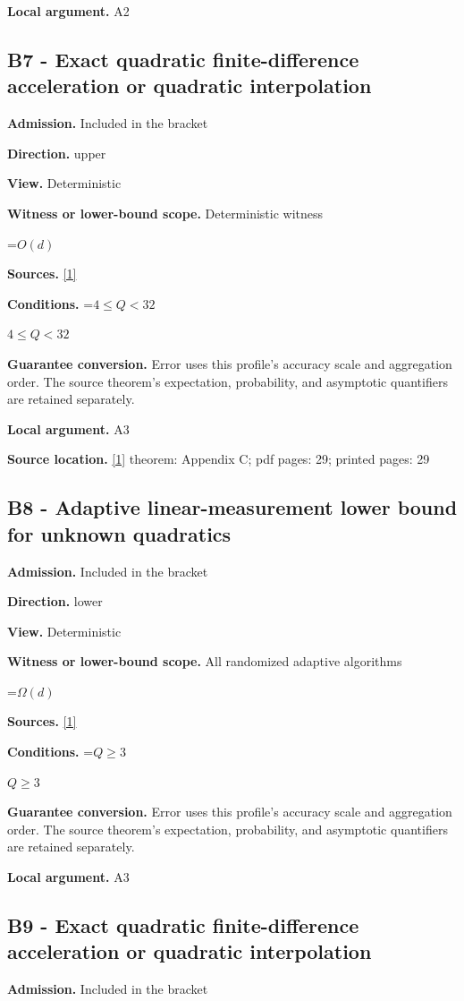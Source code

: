 \documentclass[10pt,a4paper]{article}
\newcommand{\AtlasMath}[1]{\par\begingroup\centering\setbox0=\hbox{$\displaystyle #1$}\ifdim\wd0>1.4\linewidth\typeout{ATLAS WIDE FORMULA: \the\wd0}\fi\ifdim\wd0>\linewidth\resizebox{\linewidth}{!}{\box0}\else\box0\fi\par\endgroup}
\newcommand{\AtlasInlineMath}[1]{\begingroup\setbox0=\hbox{$#1$}\ifdim\wd0>.4\linewidth\endgroup\AtlasMath{#1}\else\endgroup$#1$\fi}
\begin{document}
\textbf{Local argument.} A2

\subsection{B7 - Exact quadratic finite-difference acceleration or quadratic interpolation}
\textbf{Admission.} Included in the bracket

\textbf{Direction.} upper

\textbf{View.} Deterministic

\textbf{Witness or lower-bound scope.} Deterministic witness

\AtlasMath{O(d)}
\textbf{Sources.} \href{https://arxiv.org/html/2610.00345v1}{[1]}

\textbf{Conditions.} \AtlasInlineMath{4\le Q<32}

\textbf{Guarantee conversion.} Error uses this profile's accuracy scale and aggregation order. The source theorem's expectation, probability, and asymptotic quantifiers are retained separately.

\textbf{Local argument.} A3

\textbf{Source location.} \href{https://arxiv.org/html/2610.00345v1}{[1]} theorem: Appendix C; pdf pages: 29; printed pages: 29

\subsection{B8 - Adaptive linear-measurement lower bound for unknown quadratics}
\textbf{Admission.} Included in the bracket

\textbf{Direction.} lower

\textbf{View.} Deterministic

\textbf{Witness or lower-bound scope.} All randomized adaptive algorithms

\AtlasMath{\Omega(d)}
\textbf{Sources.} \href{https://arxiv.org/html/2610.00345v1}{[1]}

\textbf{Conditions.} \AtlasInlineMath{Q\ge 3}

\textbf{Guarantee conversion.} Error uses this profile's accuracy scale and aggregation order. The source theorem's expectation, probability, and asymptotic quantifiers are retained separately.

\textbf{Local argument.} A3

\subsection{B9 - Exact quadratic finite-difference acceleration or quadratic interpolation}
\textbf{Admission.} Included in the bracket
\end{document}
